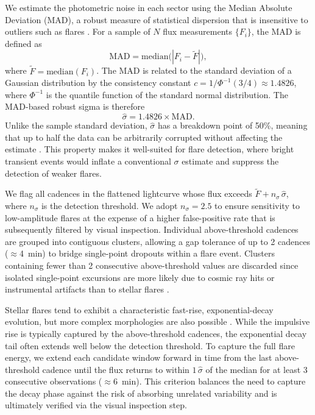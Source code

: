 \documentclass[preprint]{aastex631}
\begin{document}
We estimate the photometric noise in each sector using the Median
Absolute Deviation (MAD), a robust measure of statistical dispersion
that is insensitive to outliers such as flares
\citep{Rousseeuw1993}.  For a sample of $N$ flux measurements
$\{F_i\}$, the MAD is defined as
\begin{equation}\label{eq:mad}
  \mathrm{MAD} = \mathrm{median}\bigl(|F_i - \widetilde{F}|\bigr),
\end{equation}
where $\widetilde{F} = \mathrm{median}(F_i)$.  The MAD is related to
the standard deviation of a Gaussian distribution by the consistency
constant $c = 1/\Phi^{-1}(3/4) \approx 1.4826$, where $\Phi^{-1}$ is
the quantile function of the standard normal distribution.  The
MAD-based robust sigma is therefore
\begin{equation}\label{eq:robust_sigma}
  \hat{\sigma} = 1.4826 \times \mathrm{MAD}.
\end{equation}
Unlike the sample standard deviation, $\hat{\sigma}$ has a breakdown
point of 50\%, meaning that up to half the data can be arbitrarily
corrupted without affecting the estimate \citep{Rousseeuw1993}.  This
property makes it well-suited for flare detection, where bright
transient events would inflate a conventional $\sigma$ estimate and
suppress the detection of weaker flares.

We flag all cadences in the flattened lightcurve whose flux exceeds
$\widetilde{F} + n_\sigma\,\hat{\sigma}$, where $n_\sigma$ is the
detection threshold.  We adopt $n_\sigma = 2.5$ to ensure sensitivity
to low-amplitude flares at the expense of a higher false-positive rate
that is subsequently filtered by visual inspection.  Individual
above-threshold cadences are grouped into contiguous clusters, allowing
a gap tolerance of up to 2 cadences ($\approx$4~min) to bridge
single-point dropouts within a flare event.  Clusters containing fewer
than 2 consecutive above-threshold values are
discarded since isolated single-point excursions are more likely due to
cosmic ray hits or instrumental artifacts than to stellar flares
\citep{Ilin2021}.

Stellar flares tend to exhibit a characteristic fast-rise, exponential-decay
evolution, but more complex morphologies are also possible \citep{Davenport2014}.  While the impulsive rise is
typically captured by the above-threshold cadences, the exponential
decay tail often extends well below the detection threshold.  To
capture the full flare energy, we extend each candidate window forward
in time from the last above-threshold cadence until the flux returns
to within $1\,\hat{\sigma}$ of the median for at least 3 consecutive
observations ($\approx$6~min).  This criterion balances the need to
capture the decay phase against the risk of absorbing unrelated
variability and is ultimately verified via the visual inspection step.
\end{document}
